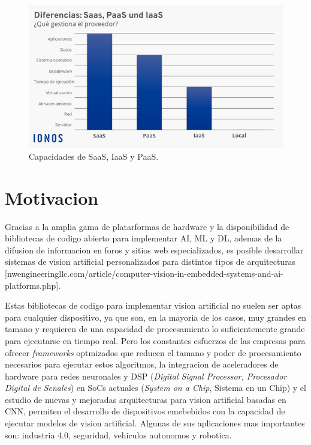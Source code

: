 \begin{figure}[h]
	\centering
	\includegraphics[scale=0.55]{./Figures/cloud_services.png}
	\caption{Capacidades de SaaS, IaaS y PaaS\protect\footnotemark.}
	\label{fig:cloud_services}
\end{figure}


\section{Motivacion}
Gracias a la amplia gama de platarformas de hardware y la disponibilidad de bibliotecas de codigo abierto para implementar AI, ML y DL, ademas de la difusion de informacion en foros y sitios web especializados, es posible desarrollar sistemas de vision artificial personalizados para distintos tipos de arquitecturas [nwengineeringllc.com/article/computer-vision-in-embedded-systems-and-ai-platforms.php]. 

Estas bibliotecas de codigo para implementar vision artificial no suelen ser aptas para cualquier dispositivo, ya que son, en la mayoria de los casos, muy grandes en tamano y requieren de una capacidad de procesamiento lo suficientemente grande para ejecutarse en tiempo real. Pero los constantes esfuerzos de las empresas para ofrecer \textit{frameworks} optmizados que reducen el tamano y poder de procesamiento necesarios para ejecutar estos algoritmos, la integracion de aceleradores de hardware para redes neuronales y DSP (\textit{Digital Signal Processor, Procesador Digital de Senales}) en SoCs actuales (\textit{System on a Chip}, Sistema en un Chip) y el estudio de nuevas y mejoradas arquitecturas para vision artificial basadas en CNN, permiten el desarrollo de dispositivos emebebidos con la capacidad de ejecutar modelos de vision artificial. Algunas de sus aplicaciones mas importantes son: industria 4.0, seguridad, vehiculos autonomos y robotica.

